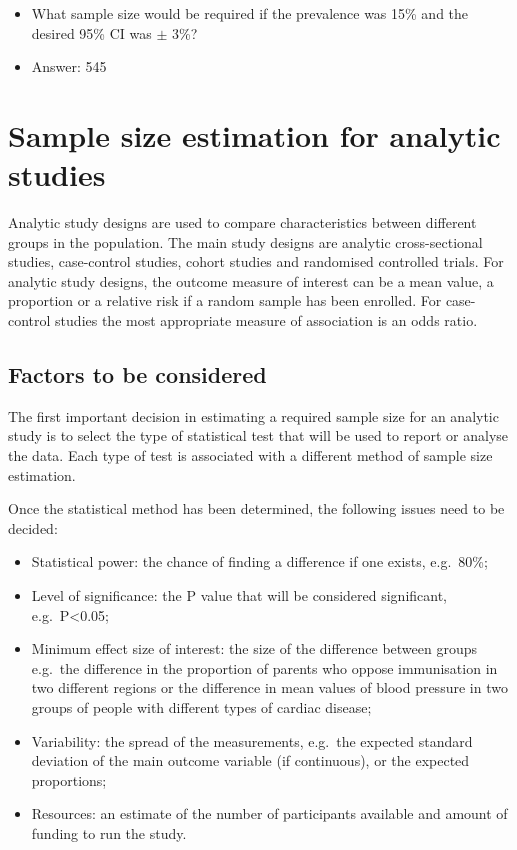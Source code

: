 \documentclass[
  a4paper,
]{memoir}
\providecommand{\tightlist}{%
  \setlength{\itemsep}{0pt}\setlength{\parskip}{0pt}}
\begin{document}
\begin{itemize}
\tightlist
\item
  What sample size would be required if the prevalence was 15\% and the
  desired 95\% CI was \(\pm\) 3\%?
\item
  Answer: 545
\end{itemize}

\section{Sample size estimation for analytic
studies}\label{sample-size-estimation-for-analytic-studies}

Analytic study designs are used to compare characteristics between
different groups in the population. The main study designs are analytic
cross-sectional studies, case-control studies, cohort studies and
randomised controlled trials. For analytic study designs, the outcome
measure of interest can be a mean value, a proportion or a relative risk
if a random sample has been enrolled. For case-control studies the most
appropriate measure of association is an odds ratio.

\subsection{Factors to be considered}\label{factors-to-be-considered}

The first important decision in estimating a required sample size for an
analytic study is to select the type of statistical test that will be
used to report or analyse the data. Each type of test is associated with
a different method of sample size estimation.

Once the statistical method has been determined, the following issues
need to be decided:

\begin{itemize}
\tightlist
\item
  Statistical power: the chance of finding a difference if one exists,
  e.g.~80\%;
\item
  Level of significance: the P value that will be considered
  significant, e.g.~P\textless0.05;
\item
  Minimum effect size of interest: the size of the difference between
  groups e.g.~the difference in the proportion of parents who oppose
  immunisation in two different regions or the difference in mean values
  of blood pressure in two groups of people with different types of
  cardiac disease;
\item
  Variability: the spread of the measurements, e.g.~the expected
  standard deviation of the main outcome variable (if continuous), or
  the expected proportions;
\item
  Resources: an estimate of the number of participants available and
  amount of funding to run the study.
\end{itemize}
\end{document}
